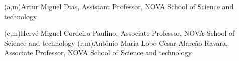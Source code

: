 %
%
%
%
(a,m){Artur Miguel Dias, Assistant Professor, NOVA School of Science and technology}



%
%
%
%
(c,m){Hervé Miguel Cordeiro Paulino, Associate Professor, NOVA School of Science and technology}
(r,m){António Maria Lobo César Alarcão Ravara, Associate Professor, NOVA School of Science and technology}
